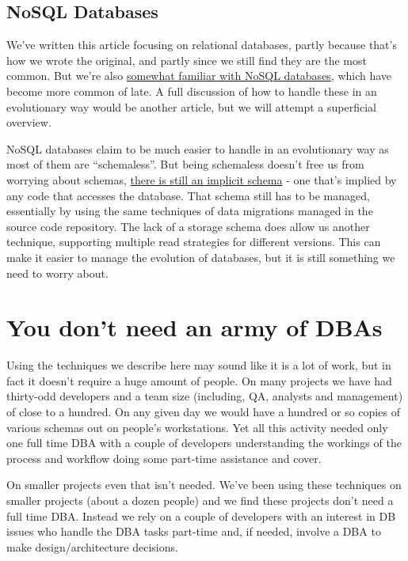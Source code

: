 \documentclass[12pt]{article}
\begin{document}
\subsection{NoSQL Databases}

We've written this article focusing on relational databases, partly
because that's how we wrote the original, and partly since we still find
they are the most common. But we're also
\href{https://martinfowler.com/books/nosql.html}{somewhat familiar with
NoSQL databases}, which have become more common of late. A full
discussion of how to handle these in an evolutionary way would be
another article, but we will attempt a superficial overview.

NoSQL databases claim to be much easier to handle in an evolutionary way
as most of them are “schemaless”. But being schemaless doesn't free us
from worrying about schemas,
\href{https://martinfowler.com/articles/schemaless/}{there is still an
implicit schema} - one that's implied by any code that accesses the
database. That schema still has to be managed, essentially by using the
same techniques of data migrations managed in the source code
repository. The lack of a storage schema does allow us another
technique, supporting multiple read strategies for different versions.
This can make it easier to manage the evolution of databases, but it is
still something we need to worry about.

\section{You don't need an army of DBAs}

Using the techniques we describe here may sound like it is a lot of
work, but in fact it doesn't require a huge amount of people. On many
projects we have had thirty-odd developers and a team size (including,
QA, analysts and management) of close to a hundred. On any given day we
would have a hundred or so copies of various schemas out on people's
workstations. Yet all this activity needed only one full time DBA with a
couple of developers understanding the workings of the process and
workflow doing some part-time assistance and cover.

On smaller projects even that isn't needed. We've been using these
techniques on smaller projects (about a dozen people) and we find these
projects don't need a full time DBA. Instead we rely on a couple of
developers with an interest in DB issues who handle the DBA tasks
part-time and, if needed, involve a DBA to make design/architecture
decisions.
\end{document}
